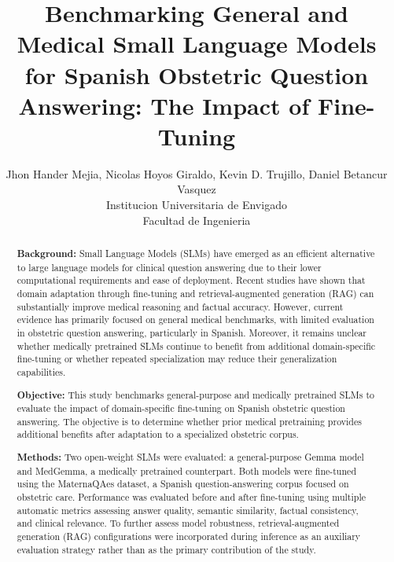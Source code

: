 \documentclass[11pt]{article}
\title{Benchmarking General and Medical Small Language Models for Spanish Obstetric Question Answering: The Impact of Fine-Tuning}
\author{Jhon Hander Mejia, Nicolas Hoyos Giraldo, Kevin D. Trujillo, Daniel Betancur Vasquez\\
Institucion Universitaria de Envigado\\
Facultad de Ingenieria}
\date{}
\begin{document}
\raggedbottom
\maketitle

\begin{abstract}
\textbf{Background:} Small Language Models (SLMs) have emerged as an efficient alternative to large language models for clinical question answering due to their lower computational requirements and ease of deployment. Recent studies have shown that domain adaptation through fine-tuning and retrieval-augmented generation (RAG) can substantially improve medical reasoning and factual accuracy. However, current evidence has primarily focused on general medical benchmarks, with limited evaluation in obstetric question answering, particularly in Spanish. Moreover, it remains unclear whether medically pretrained SLMs continue to benefit from additional domain-specific fine-tuning or whether repeated specialization may reduce their generalization capabilities.

\textbf{Objective:} This study benchmarks general-purpose and medically pretrained SLMs to evaluate the impact of domain-specific fine-tuning on Spanish obstetric question answering. The objective is to determine whether prior medical pretraining provides additional benefits after adaptation to a specialized obstetric corpus.

\textbf{Methods:} Two open-weight SLMs were evaluated: a general-purpose Gemma model and MedGemma, a medically pretrained counterpart. Both models were fine-tuned using the MaternaQA\-es dataset, a Spanish question-answering corpus focused on obstetric care. Performance was evaluated before and after fine-tuning using multiple automatic metrics assessing answer quality, semantic similarity, factual consistency, and clinical relevance. To further assess model robustness, retrieval-augmented generation (RAG) configurations were incorporated during inference as an auxiliary evaluation strategy rather than as the primary contribution of the study.
\end{abstract}

\newpage
\end{document}
